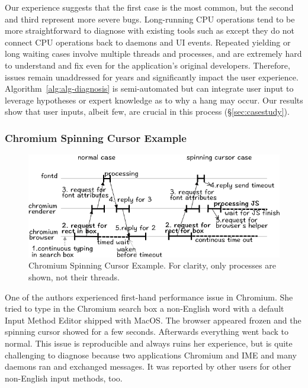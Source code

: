\noindent
Our experience suggests that the first case is the most common, but the
second and third represent more severe bugs. Long-running CPU operations tend to
be more straightforward to diagnose with existing tools such as \spindump except
they do not connect CPU operations back to daemons and UI events. Repeated yielding or
long waiting cases involve multiple threads and processes, and are extremely
hard to understand and fix even for the application's original developers.
Therefore, issues remain unaddressed for years and significantly impact the
user experience. Algorithm~\ref{alg:alg-diagnosis} is semi-automated but can
integrate user input to leverage hypotheses or expert knowledge
as to why a hang may occur. Our results show that user inputs, albeit few, are
crucial in this process (\S\ref{sec:casestudy}).

\subsubsection{Chromium Spinning Cursor Example}

\begin{figure}[tb]
	\footnotesize
    \centering
	\includegraphics[width=\columnwidth]{./figures/chromium_case_study_1.png}
    \caption{Chromium Spinning Cursor Example. For clarity, only processes are
shown, not their threads.}
    \label{fig:chromium-case-study}
\end{figure}

One of the authors experienced first-hand performance issue
in Chromium. She tried to type in
the Chromium search box a non-English word with a default Input Method Editor
shipped with MacOS. The browser appeared frozen and the spinning cursor showed
for a few seconds. Afterwards everything went back to normal. This issue is
reproducible and always ruins her experience, but is quite challenging to
diagnose because two applications Chromium and IME and many daemons ran and
exchanged messages. It was reported by other users for other non-English input
methods, too.

